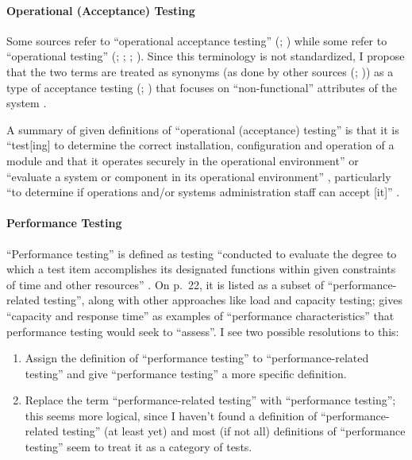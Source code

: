 \paragraph{Operational (Acceptance) Testing}
Some sources refer to ``operational acceptance testing'' (\citealp[p.~22]{IEEE2022};
) while some refer to ``operational testing''
(\citealp[p.~6-9, in the context of software engineering operations]{SWEBOK2024};
\citealp{ISO_IEC2018}; \citealp[p.~303]{IEEE2017};
\citealp[pp.~4-6, 4-9]{SWEBOK2014}). Since this terminology is not standardized, I
propose that the two terms are treated as synonyms (as done by other sources
(\citealp{LambdaTest2024}; \citealp{BocchinoAndHamilton1996})) as a type of
acceptance testing (\citealp[p.~22]{IEEE2022}; ) that focuses on
``non-functional'' attributes of the system \citep{LambdaTest2024}
.

A summary of given definitions of ``operational (acceptance) testing'' is that
it is ``test[ing] to determine the correct
installation, configuration and operation of a module and that it operates
securely in the operational environment'' \citep{ISO_IEC2018} or ``evaluate a
system or component in its operational environment'' \citep[p.~303]{IEEE2017},
particularly ``to determine if operations and/or systems administration staff
can accept [it]'' .

\paragraph{Performance Testing}

``Performance testing'' is defined as testing ``conducted to
evaluate the degree to which a test item accomplishes its
designated functions within given constraints of time and other
resources'' \cite[p.~7]{IEEE2022}. On p.~22, it is listed
as a subset of ``performance-related testing'', along with other
approaches like load and capacity testing; \citet[p.~5-9]{SWEBOK2024}
gives ``capacity and response time'' as examples of ``performance
characteristics'' that performance testing would seek to ``assess''.
I see two possible resolutions to this:
\begin{enumerate}
      \item Assign the definition of ``performance testing'' to
            ``performance-related testing'' and give ``performance
            testing'' a more specific definition.
      \item Replace the term ``performance-related testing'' with
            ``performance testing''; this seems more logical, since
            I haven't found a definition of ``performance-related
            testing'' (at least yet) and most (if not all)
            definitions of ``performance testing'' seem to treat it
            as a category of tests.
\end{enumerate}
\label{perf-test-ambiguity}


